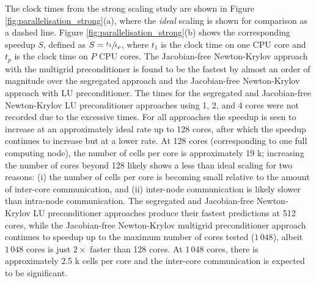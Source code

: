 \documentclass[sn-mathphys,Numbered]{sn-jnl}%
\begin{document}
The clock times from the strong scaling study are shown in Figure \ref{fig:parallelisation_strong}(a), where the \emph{ideal} scaling is shown for comparison as a dashed line.
Figure \ref{fig:parallelisation_strong}(b) shows the corresponding speedup $S$, defined as $S = \sfrac{t_1}{t_p}$, where $t_1$ is the clock time on one CPU core and $t_p$ is the clock time on $P$ CPU cores.
The Jacobian-free Newton-Krylov approach with the multigrid preconditioner is found to be the fastest by almost an order of magnitude over the segregated approach and the Jacobian-free Newton-Krylov approach with LU preconditioner.
The times for the segregated and Jacobian-free Newton-Krylov LU preconditioner approaches using 1, 2, and 4 cores were not recorded due to the excessive times.
For all approaches the speedup is seen to increase at an approximately ideal rate up to 128 cores, after which the speedup continues to increase but at a lower rate.
At 128 cores (corresponding to one full computing node), the number of cells per core is approximately 19 k; increasing the number of cores beyond 128 likely shows a less than ideal scaling for two reasons: (i) the number of cells per core is becoming small relative to the amount of inter-core communication, and (ii) inter-node communication is likely slower than intra-node communication.
The segregated and Jacobian-free Newton-Krylov LU preconditioner approaches produce their fastest predictions at 512 cores, while the Jacobian-free Newton-Krylov multigrid preconditioner approach continues to speedup up to the maximum number of cores tested ($1\,048$), albeit $1\,048$ cores is just $2\times$ faster than 128 cores.
At $1\,048$ cores, there is approximately 2.5 k cells per core and the inter-core communication is expected to be significant.
\end{document}
